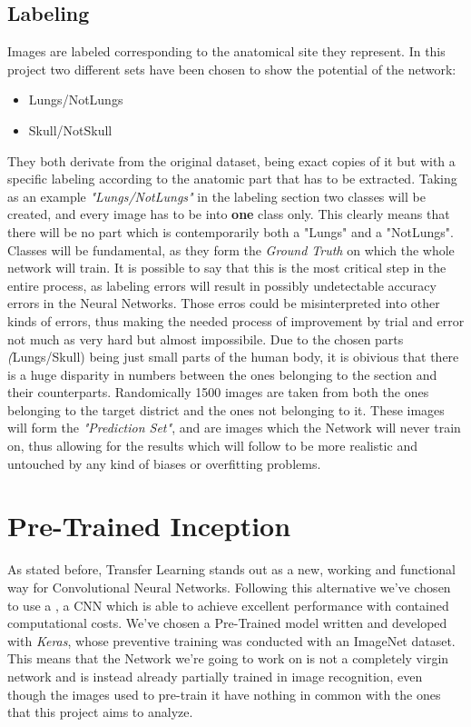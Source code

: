 \documentclass[../main.tex]{subfiles}
\begin{document}
\subsection{Labeling}
Images are labeled corresponding to the anatomical site they represent. In this project two different sets have been chosen to show the potential of the network:
\begin{itemize}
	\item Lungs/NotLungs
	\item Skull/NotSkull
\end{itemize}
They both derivate from the original dataset, being exact copies of it but with a specific labeling according to the anatomic part that has to be extracted. Taking as an example \textit{"Lungs/NotLungs"} in the labeling section two classes will be created, and every image has to be into \textbf{one} class only. This clearly means that there will be no part which is contemporarily both a "Lungs" and a "NotLungs". Classes will be fundamental, as they form the \textit{Ground Truth} on which the whole network will train. It is possible to say that this is the most critical step in the entire process, as labeling errors will result in possibly undetectable accuracy errors in the Neural Networks. Those erros could be misinterpreted into other kinds of errors, thus making the needed process of improvement by trial and error not much as very hard but almost impossibile.
Due to the chosen parts \textit(Lungs/Skull) being just small parts of the human body, it is obivious that there is a huge disparity in numbers between the ones belonging to the section and their counterparts. Randomically 1500 images are taken from both the ones belonging to the target district and the ones not belonging to it. These images will form the \textit{"Prediction Set"}, and are images which the Network will never train on, thus allowing for the results which will follow to be more realistic and untouched by any kind of biases or overfitting problems. 

\section{Pre-Trained Inception}
As stated before, Transfer Learning stands out as a new, working and functional way for Convolutional Neural Networks. Following this alternative we've chosen to use a , a CNN which is able to achieve excellent performance with contained computational costs.\cite{Szegedy2015a} We've chosen a Pre-Trained model written and developed with \textit{Keras}, whose preventive training was conducted with an ImageNet dataset.\cite{kerasinception} This means that the Network we're going to work on is not a completely virgin network and is instead already partially trained in image recognition, even though the images used to pre-train it have nothing in common with the ones that this project aims to analyze.
\end{document}
